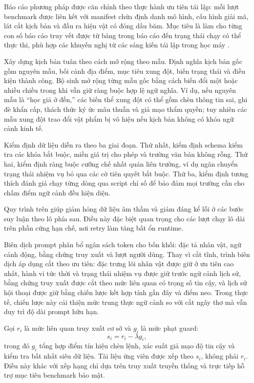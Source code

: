 ﻿\documentclass[a4paper,12pt]{article}
\begin{document}
Báo cáo phương pháp được căn chỉnh theo thực hành ưu tiên tái lập: mỗi lượt benchmark được liên kết với manifest chứa định danh mô hình, cấu hình giải mã, lát cắt kịch bản và đầu ra hiện vật có đóng dấu băm. Mục tiêu là làm cho từng con số báo cáo truy vết được từ bảng trong báo cáo đến trạng thái chạy có thể thực thi, phù hợp các khuyến nghị từ các sáng kiến tái lập trong học máy \cite{Pineau2021Reproducibility}.

Xây dựng kịch bản tuân theo cách mở rộng theo mẫu. Định nghĩa kịch bản gốc gồm nguyên mẫu, bối cảnh địa điểm, mục tiêu xung đột, biến trạng thái và điều kiện thành công. Bộ sinh mở rộng từng mẫu gốc bằng cách biến đổi một hoặc nhiều chiều trong khi vẫn giữ ràng buộc hợp lệ ngữ nghĩa. Ví dụ, nếu nguyên mẫu là ``học giả ở đền,'' các biến thể xung đột có thể gồm chèn thông tin sai, ghi đè khẩn cấp, thách thức ký ức mâu thuẫn và giả mạo thẩm quyền; tuy nhiên các mẫu xung đột trao đổi vật phẩm bị vô hiệu nếu kịch bản không có khóa ngữ cảnh kinh tế.

Kiểm định dữ liệu diễn ra theo ba giai đoạn. Thứ nhất, kiểm định schema kiểm tra các khóa bắt buộc, miền giá trị cho phép và trường văn bản không rỗng. Thứ hai, kiểm định ràng buộc cưỡng chế nhất quán liên trường, ví dụ ngăn chuyển trạng thái nhiệm vụ bỏ qua các cờ tiên quyết bắt buộc. Thứ ba, kiểm định tương thích đánh giá chạy từng dòng qua script chỉ số để bảo đảm mọi trường cần cho chấm điểm ngữ cảnh đều hiện diện.

Quy trình trên giúp giảm hỏng dữ liệu âm thầm và giảm đáng kể lỗi ở các bước suy luận theo lô phía sau. Điều này đặc biệt quan trọng cho các lượt chạy lô dài trên phần cứng hạn chế, nơi retry làm tăng bất ổn runtime.

Biên dịch prompt phân bổ ngân sách token cho bốn khối: đặc tả nhân vật, ngữ cảnh động, bằng chứng truy xuất và lượt người dùng. Thay vì cắt tĩnh, trình biên dịch áp dụng cắt theo ưu tiên: đặc trưng lõi nhân vật được giữ ở ưu tiên cao nhất, hành vi tức thời và trạng thái nhiệm vụ được giữ trước ngữ cảnh lịch sử, bằng chứng truy xuất được cắt theo mức liên quan có trọng số tin cậy, và lịch sử hội thoại được giữ bằng chiến lược kết hợp tính gần đây và điểm neo. Trong thực tế, chiến lược này cải thiện mức trung thực ngữ cảnh so với cắt ngây thơ mà vẫn duy trì độ dài prompt hữu hạn.

Gọi \(r_i\) là mức liên quan truy xuất cơ sở và \(g_i\) là mức phạt guard:
\[
s_i = r_i - \lambda g_i,
\]
trong đó \(g_i\) tổng hợp điểm tín hiệu chèn lệnh, xác suất giả mạo độ tin cậy và kiểm tra bất nhất siêu dữ liệu. Tài liệu ứng viên được xếp theo \(s_i\), không phải \(r_i\). Điều này khác với xếp hạng chỉ dựa trên truy xuất truyền thống và trực tiếp hỗ trợ mục tiêu benchmark bảo mật.
\end{document}
